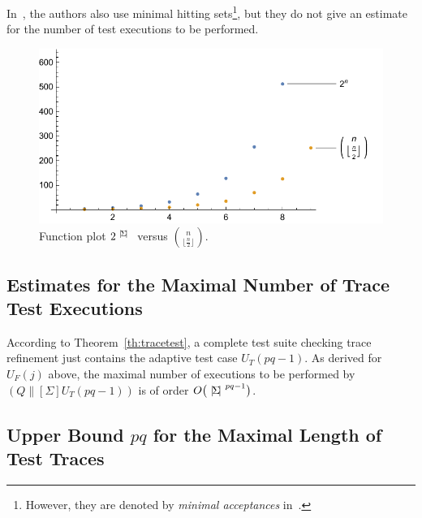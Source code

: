  
In~\cite{DBLP:conf/icfem/CavalcantiG07}, the authors also use minimal hitting
sets\footnote{However, they are denoted by {\it minimal acceptances}
in~\cite{DBLP:conf/icfem/CavalcantiG07}.}, but they do not give an estimate for the number of test executions to be performed.


 \begin{figure}
 \begin{center}
\includegraphics[width=.8\textwidth]{curvecomparison.pdf}
\end{center}
\caption{Function plot $2^{{~|\! \Sigma\!|~}}$ versus $\binom{n}{\lfloor \frac{n}{2}\rfloor}$.}
 \label{fig:minhita}
 \end{figure}
 
 
\subsection{Estimates for the Maximal Number of Trace Test Executions}

According to Theorem~\ref{th:tracetest}, a complete test suite checking trace
refinement just contains the adaptive test case $U_T(pq-1)$. As derived for
$U_F(j)$ above, the maximal number of executions to be performed by $(Q\parallel[\Sigma]
U_T(pq-1))$ is of order  $O\big({~|\! \Sigma\!|~}^{pq-1}\big)$.

\subsection{Upper Bound $pq$ for the Maximal Length of Test Traces}

